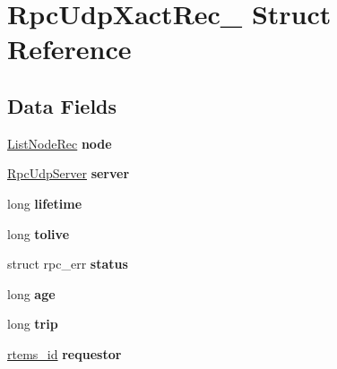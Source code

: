\hypertarget{structRpcUdpXactRec__}{}\section{Rpc\+Udp\+Xact\+Rec\+\_\+ Struct Reference}
\label{structRpcUdpXactRec__}
\subsection*{Data Fields}
\begin{DoxyCompactItemize}
\item 
\mbox{\label{structRpcUdpXactRec___a8146955c69d1e663f6d2a08234b7dcf5}} 
\mbox{\hyperlink{structListNodeRec__}{List\+Node\+Rec}} {\bfseries node}
\item 
\mbox{\label{structRpcUdpXactRec___a3955c7713502129ed649f231145adbe5}} 
\mbox{\hyperlink{structRpcUdpServerRec__}{Rpc\+Udp\+Server}} {\bfseries server}
\item 
\mbox{\label{structRpcUdpXactRec___a0c29b6db212fc8fcd5ebd9669b34115d}} 
long {\bfseries lifetime}
\item 
\mbox{\label{structRpcUdpXactRec___a504c89de08440241f9f39e66bdf2c1fa}} 
long {\bfseries tolive}
\item 
\mbox{\label{structRpcUdpXactRec___a8f1ade0f11fc934ca7e9c50ad8c6f673}} 
struct rpc\+\_\+err {\bfseries status}
\item 
\mbox{\label{structRpcUdpXactRec___a5ad0b1d1e3425efe145ccb7bad82fa2d}} 
long {\bfseries age}
\item 
\mbox{\label{structRpcUdpXactRec___a0b0ec1658eed3a71dff8e37d673708f3}} 
long {\bfseries trip}
\item 
\mbox{\label{structRpcUdpXactRec___a25e92ba58c8d9178a6ff5a1aca9910a0}} 
\mbox{\hyperlink{group__ClassicTasks_gab20892b814dced7dd4e5b9bf42becd57}{rtems\+\_\+id}} {\bfseries requestor}
\item 
\mbox{\label{structRpcUdpXactRec___a488f6622b609756da480203d9c25697d}} 

\end{DoxyCompactItemize}
